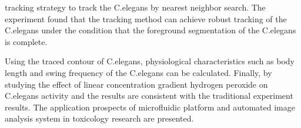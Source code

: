 \begin{englishabstract}
\begin{enumerate*}[label=\itshape\alph*)\upshape]
	tracking strategy to track the C.elegans by nearest neighbor search.
 The experiment found that the tracking method can achieve robust
 tracking of the C.elegans under the condition that 
 the foreground segmentation of the C.elegans is complete.\quad
\end{enumerate*}
 Using the traced contour of C.elegans, physiological characteristics such as 
 body length and swing frequency of the C.elegans can be calculated.
 Finally, by studying the effect of linear concentration gradient
 hydrogen peroxide on C.elegans activity and the results are consistent with the
traditional experiment results. The application prospects
 of microfluidic platform and automated image analysis system in toxicology research are presented.
 
\end{englishabstract}

